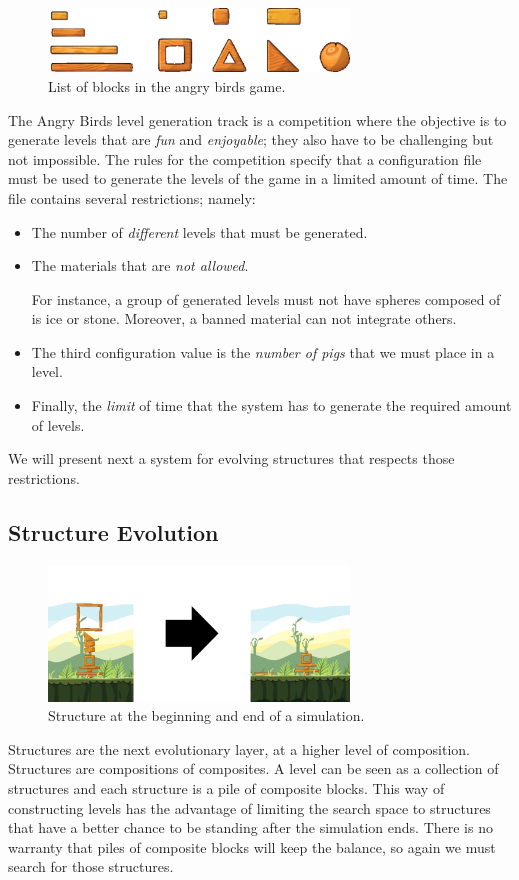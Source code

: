 \documentclass[conference]{IEEEtran}
\begin{document}
\begin{figure}[htbp]
\centerline{\includegraphics[width=80mm]{Images/list_pieces.png}}
\caption{List of blocks in the angry birds game.}
\label{piece_list}
\end{figure}
The Angry Birds level generation track is a competition where the objective
is to generate levels that are \textit{fun} and \textit{enjoyable}; they also have to be challenging but not impossible. The rules for the
competition specify that a configuration file must be used to generate the
levels of the game in a limited amount of time. The file contains several
restrictions; namely:\begin{itemize}
\item   The number of \textit{different}
levels that must be generated. 
\item The materials that are \textit{not allowed}.

For instance, a group of generated levels must not have spheres composed of  is ice or stone. Moreover, a banned material can
not integrate others. 
\item The third configuration value is the \textit{number of
pigs} that we must place in a level. 
\item Finally, the \textit{limit} of time
that the system has to generate the required amount of levels.
\end{itemize}

We will present next a system for evolving structures that respects those restrictions.

\subsection{Structure Evolution}
   
    \begin{figure}[htbp]
    \centerline{\includegraphics[width=80mm]{Images/simulation_bef_aft_example.png}}
    \caption{Structure at the beginning and end of a simulation.}
    \label{test_old}
    \end{figure}
    Structures are the next evolutionary layer, at a higher level of composition.
    Structures are compositions of composites. A level can be seen as a collection 
    of structures and each structure is a pile of composite blocks. This way of 
    constructing levels has the advantage of
    limiting the search space to structures that have a better chance to be 
    standing after the simulation ends. There is no warranty that piles of 
    composite blocks will keep the balance, so again we must search for those 
    structures.
\end{document}
